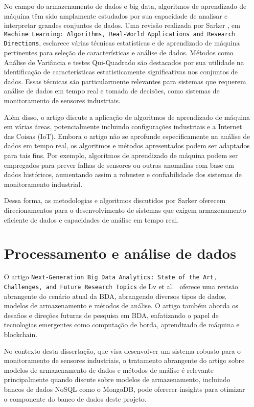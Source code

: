 No campo do armazenamento de dados e big data, algoritmos de aprendizado de máquina têm sido amplamente estudados por sua capacidade de analisar e interpretar grandes conjuntos de dados. Uma revisão realizada por Sarker \cite{sarker2021machine}, em \texttt{Machine Learning: Algorithms, Real-World Applications and Research Directions}, esclarece várias técnicas estatísticas e de aprendizado de máquina pertinentes para seleção de características e análise de dados. Métodos como Análise de Variância e testes Qui-Quadrado são destacados por sua utilidade na identificação de características estatisticamente significativas nos conjuntos de dados. Essas técnicas são particularmente relevantes para sistemas que requerem análise de dados em tempo real e tomada de decisões, como sistemas de monitoramento de sensores industriais.

Além disso, o artigo discute a aplicação de algoritmos de aprendizado de máquina em várias áreas, potencialmente incluindo configurações industriais e a Internet das Coisas (IoT). Embora o artigo não se aprofunde especificamente na análise de dados em tempo real, os algoritmos e métodos apresentados podem ser adaptados para tais fins. Por exemplo, algoritmos de aprendizado de máquina podem ser empregados para prever falhas de sensores ou outras anomalias com base em dados históricos, aumentando assim a robustez e confiabilidade dos sistemas de monitoramento industrial.

Dessa forma, as metodologias e algoritmos discutidos por Sarker \cite{sarker2021machine} oferecem direcionamentos para o desenvolvimento de sistemas que exigem armazenamento eficiente de dados e capacidades de análise em tempo real.


\section{Processamento e análise de dados}
O artigo \texttt{Next-Generation Big Data Analytics: State of the Art, Challenges, and Future Research Topics} de Lv et al.~\cite{Lv2017} oferece uma revisão abrangente do cenário atual da \gls{BDA}, abrangendo diversos tipos de dados, modelos de armazenamento e métodos de análise. O artigo também aborda os desafios e direções futuras de pesquisa em \gls{BDA}, enfatizando o papel de tecnologias emergentes como computação de borda, aprendizado de máquina e blockchain.

No contexto desta dissertação, que visa desenvolver um sistema robusto para o monitoramento de sensores industriais, o tratamento abrangente do artigo sobre modelos de armazenamento de dados e métodos de análise é relevante principalmente quando discute sobre modelos de armazenamento, incluindo bancos de dados NoSQL como o MongoDB, pode oferecer insights para otimizar o componente do banco de dados deste projeto.


